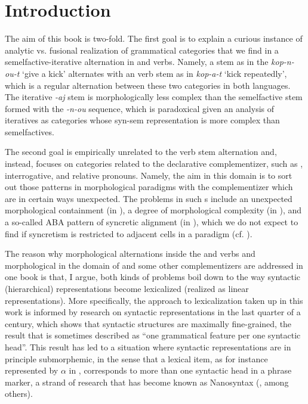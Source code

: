 \chapter{Introduction}


The aim of this book is two-fold. The first goal is to explain a curious instance of analytic vs. fusional realization of grammatical categories that we find in a   semelfactive-iterative alternation in  and  verbs. Namely, a     stem as in the  \textit{kop-n-ou-t} `give a kick' alternates with an  verb stem as in \textit{kop-a-t} `kick repeatedly', which is a regular alternation between these two categories in both languages. The iterative \textit{-aj} stem is morphologically less complex than the semelfactive stem formed with the \textit{-n-ou} sequence, which is paradoxical given an analysis of iteratives as categories whose syn-sem representation is more complex than semelfactives. 
\par
The second goal is empirically unrelated to the verb stem alternation and, instead, focuses on categories related to the declarative complementizer,  such as , interrogative, and  relative pronouns.   Namely, the aim in this domain is to sort out those patterns in morphological paradigms with the complementizer which are in certain ways unexpected.  The problems in such s include an unexpected morphological containment (in ), a degree of morphological complexity (in ), and a so-called  ABA pattern of syncretic alignment (in ), which we do not expect to find if syncretism is restricted to adjacent cells in a paradigm (cf. \citealt{Bobaljik2012}). 
\par
The reason why morphological alternations inside the  and  verbs and morphological  in the domain of  and some other complementizers are addressed in one book is that, I argue, both kinds of problems boil down to the way syntactic (hierarchical) representations become lexicalized (realized as linear representations).  More specifically, the approach to lexicalization taken up in this work is informed by research on syntactic representations in the last quarter of a century, which shows that syntactic structures are maximally fine-grained, the result that is sometimes described as ``one grammatical feature per one syntactic head''. This result has led to a situation where syntactic representations are in principle submorphemic, in the sense that a lexical item, as for instance represented by $\alpha$ in \Next, corresponds to more than one syntactic head in a phrase marker, a strand of research that has become known as Nanosyntax (\citealt{Starke2009}, among others).


